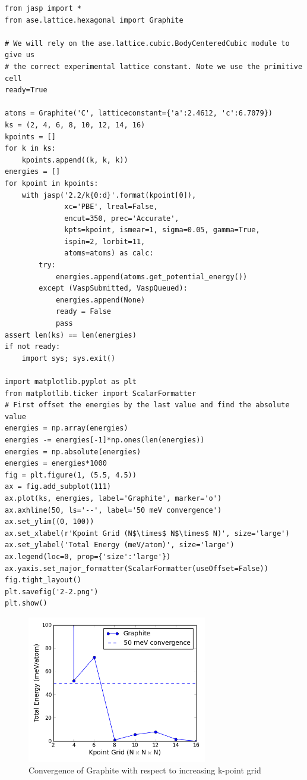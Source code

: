\documentclass[11pt]{article}
\begin{document}
\begin{verbatim}
from jasp import *
from ase.lattice.hexagonal import Graphite

# We will rely on the ase.lattice.cubic.BodyCenteredCubic module to give us
# the correct experimental lattice constant. Note we use the primitive cell
ready=True

atoms = Graphite('C', latticeconstant={'a':2.4612, 'c':6.7079})
ks = (2, 4, 6, 8, 10, 12, 14, 16)
kpoints = []
for k in ks:
    kpoints.append((k, k, k))
energies = []
for kpoint in kpoints:
    with jasp('2.2/k{0:d}'.format(kpoint[0]),
              xc='PBE', lreal=False,
              encut=350, prec='Accurate',
              kpts=kpoint, ismear=1, sigma=0.05, gamma=True,
              ispin=2, lorbit=11,
              atoms=atoms) as calc:
        try:
            energies.append(atoms.get_potential_energy())
        except (VaspSubmitted, VaspQueued):
            energies.append(None)
            ready = False
            pass
assert len(ks) == len(energies)
if not ready:
    import sys; sys.exit()

import matplotlib.pyplot as plt
from matplotlib.ticker import ScalarFormatter
# First offset the energies by the last value and find the absolute value
energies = np.array(energies)
energies -= energies[-1]*np.ones(len(energies))
energies = np.absolute(energies)
energies = energies*1000
fig = plt.figure(1, (5.5, 4.5))
ax = fig.add_subplot(111)
ax.plot(ks, energies, label='Graphite', marker='o')
ax.axhline(50, ls='--', label='50 meV convergence')
ax.set_ylim((0, 100))
ax.set_xlabel(r'Kpoint Grid (N$\times$ N$\times$ N)', size='large')
ax.set_ylabel('Total Energy (meV/atom)', size='large')
ax.legend(loc=0, prop={'size':'large'})
ax.yaxis.set_major_formatter(ScalarFormatter(useOffset=False))
fig.tight_layout()
plt.savefig('2-2.png')
plt.show()
\end{verbatim}

\begin{figure}[H]
\centering
\includegraphics[width=0.7\textwidth]{./2-2.png}
\caption{Convergence of Graphite with respect to increasing k-point grid}
\end{figure}
\end{document}
